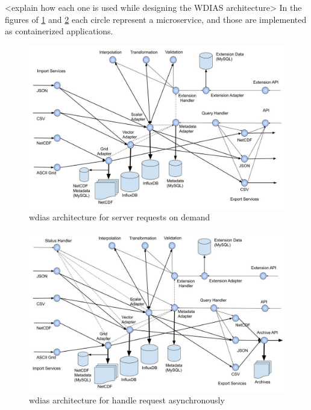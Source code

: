 <explain how each one is used while designing the WDIAS architecture>
In the figures of \ref{fi:wdias_micro_on_demand} and \ref{fi:wdias_micro_async} each circle represent a microservice, and those are implemented as containerized applications.
\begin{figure}[htp]
    \centering
    \includegraphics[width=1\textwidth]{method/microservice/microservice_architecture-handle_on_demand-v3.jpg}
    \caption{\acrshort{wdias} architecture for server requests on demand}
    \label{fi:wdias_micro_on_demand}
\end{figure}

\begin{figure}[htp]
    \centering
    \includegraphics[width=1\textwidth]{method/microservice/microservice_architecture-handle_on_async-v3.jpg}
    \caption{\acrshort{wdias} architecture for handle request asynchronously}
    \label{fi:wdias_micro_async}
\end{figure}

